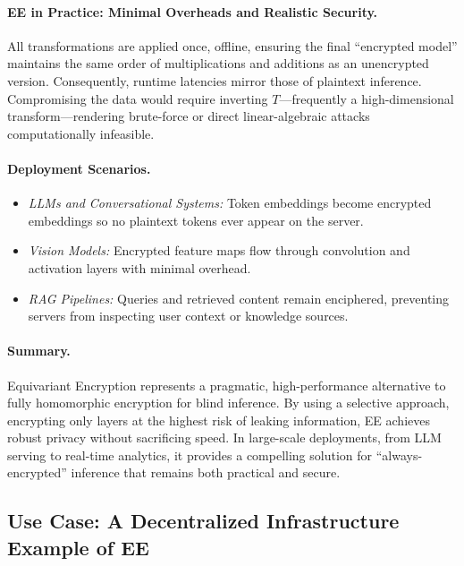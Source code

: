 \documentclass[10pt]{article}
\begin{document}
\paragraph{EE in Practice: Minimal Overheads and Realistic Security.}
All transformations are applied once, offline, ensuring the final “encrypted model” maintains the same order of multiplications and additions as an unencrypted version. Consequently, runtime latencies mirror those of plaintext inference. Compromising the data would require inverting $T$—frequently a high-dimensional transform—rendering brute-force or direct linear-algebraic attacks computationally infeasible.

\paragraph{Deployment Scenarios.}
\begin{itemize}
    \item \textit{LLMs and Conversational Systems:} Token embeddings become encrypted embeddings so no plaintext tokens ever appear on the server.
    \item \textit{Vision Models:} Encrypted feature maps flow through convolution and activation layers with minimal overhead.
    \item \textit{RAG Pipelines:} Queries and retrieved content remain enciphered, preventing servers from inspecting user context or knowledge sources.
\end{itemize}

\paragraph{Summary.}
Equivariant Encryption represents a pragmatic, high-performance alternative to fully homomorphic encryption for blind inference. By using a selective approach, encrypting only layers at the highest risk of leaking information, EE achieves robust privacy without sacrificing speed. In large-scale deployments, from LLM serving to real-time analytics, it provides a compelling solution for “always-encrypted” inference that remains both practical and secure.

\subsection{Use Case: A Decentralized Infrastructure Example of EE}
\label{sec:nesa_framework}
\end{document}
